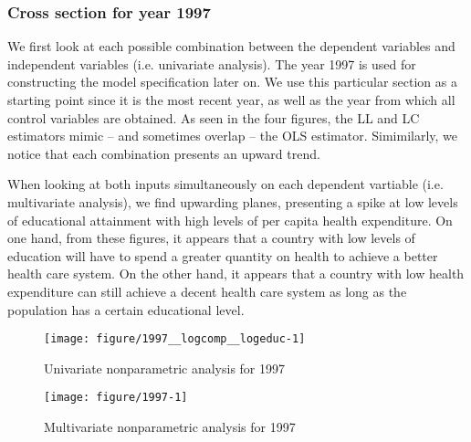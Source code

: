 \documentclass[12pt,a4paper]{article}\usepackage[]{graphicx}\usepackage[]{color}
\newenvironment{knitrout}{}{} %
\begin{document}
 
\subsubsection{Cross section for year 1997}
 
We first look at each possible combination between the dependent variables and independent variables (i.e. univariate analysis). The year 1997 is used for constructing the model specification later on. We use this particular section as a starting point since it is the most recent year, as well as the year from which all control variables are obtained. As seen in the four figures, the LL and LC estimators mimic -- and sometimes overlap -- the OLS estimator. Simimilarly, we notice that each combination presents an upward trend.
 
When looking at both inputs simultaneously on each dependent vartiable (i.e. multivariate analysis), we find upwarding planes, presenting a spike at low levels of educational attainment with high levels of per capita health expenditure. On one hand, from these figures, it appears that a country with low levels of education will have to spend a greater quantity on health to achieve a better health care system. On the other hand, it appears that a country with low health expenditure can still achieve a decent health care system as long as the population has a certain educational level.

\begin{knitrout}
\color{fgcolor}\begin{figure}[htbp]

{\centering \texttt{[image: figure/1997\_\_logcomp\_\_logeduc-1]} 

}

\caption[Univariate nonparametric analysis for 1997]{Univariate nonparametric analysis for 1997}\label{fig:1997, logcomp, logeduc}
\end{figure}


\end{knitrout}

\begin{knitrout}
\color{fgcolor}\begin{figure}[htbp]

{\centering \texttt{[image: figure/1997-1]} 

}

\caption[Multivariate nonparametric analysis for 1997]{Multivariate nonparametric analysis for 1997}\label{fig:1997}
\end{figure}


\end{knitrout}
\end{document}
